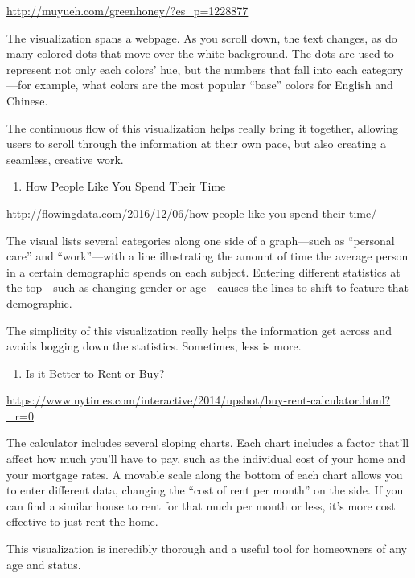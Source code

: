 \documentclass[]{book}
\providecommand{\tightlist}{%
  \setlength{\itemsep}{0pt}\setlength{\parskip}{0pt}}
\theoremstyle{definition}
\theoremstyle{definition}
\theoremstyle{definition}
\theoremstyle{remark}
\begin{document}
\url{http://muyueh.com/greenhoney/?es_p=1228877}

The visualization spans a webpage. As you scroll down, the text changes,
as do many colored dots that move over the white background. The dots
are used to represent not only each colors' hue, but the numbers that
fall into each category---for example, what colors are the most popular
``base'' colors for English and Chinese.

The continuous flow of this visualization helps really bring it
together, allowing users to scroll through the information at their own
pace, but also creating a seamless, creative work.

\begin{enumerate}
\def\labelenumi{\arabic{enumi}.}
\setcounter{enumi}{3}
\tightlist
\item
  How People Like You Spend Their Time
\end{enumerate}

\url{http://flowingdata.com/2016/12/06/how-people-like-you-spend-their-time/}

The visual lists several categories along one side of a graph---such as
``personal care'' and ``work''---with a line illustrating the amount of
time the average person in a certain demographic spends on each subject.
Entering different statistics at the top---such as changing gender or
age---causes the lines to shift to feature that demographic.

The simplicity of this visualization really helps the information get
across and avoids bogging down the statistics. Sometimes, less is more.

\begin{enumerate}
\def\labelenumi{\arabic{enumi}.}
\setcounter{enumi}{4}
\tightlist
\item
  Is it Better to Rent or Buy?
\end{enumerate}

\url{https://www.nytimes.com/interactive/2014/upshot/buy-rent-calculator.html?_r=0}

The calculator includes several sloping charts. Each chart includes a
factor that'll affect how much you'll have to pay, such as the
individual cost of your home and your mortgage rates. A movable scale
along the bottom of each chart allows you to enter different data,
changing the ``cost of rent per month'' on the side. If you can find a
similar house to rent for that much per month or less, it's more cost
effective to just rent the home.

This visualization is incredibly thorough and a useful tool for
homeowners of any age and status.
\end{document}
